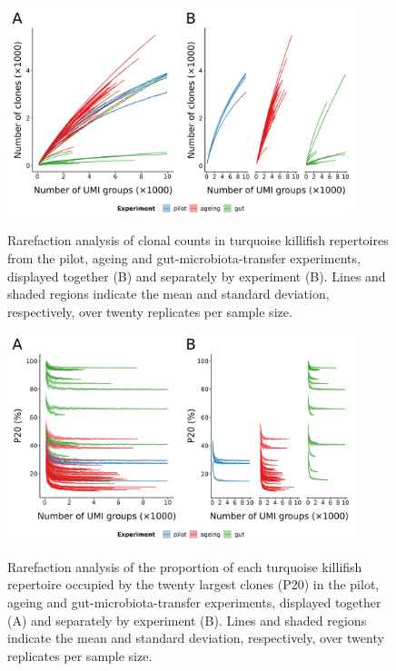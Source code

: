 \begin{figure}
\centering
\includegraphics[width = 0.9\textwidth]{_Figures/png/igseq-rarefied-clone-counts}
\begin{subfigure}{0em}
\label{fig:igseq-rarefied-clone-counts-all}
\end{subfigure}
\begin{subfigure}{0em}
\label{fig:igseq-rarefied-clone-counts-facets}
\end{subfigure}
\caption{Rarefaction analysis of clonal counts in turquoise killifish repertoires from the \igseq pilot, ageing and gut-microbiota-transfer experiments, displayed together (B) and separately by experiment (B). Lines and shaded regions indicate the mean and standard deviation, respectively, over twenty replicates per sample size.}
\label{fig:igseq-rarefied-clone-counts}
\end{figure}

\begin{figure}
\centering
\includegraphics[width = 0.9\textwidth]{_Figures/png/igseq-rarefied-clone-p20}
\begin{subfigure}{0em}
\label{fig:igseq-rarefied-clone-p20-all}
\end{subfigure}
\begin{subfigure}{0em}
\label{fig:igseq-rarefied-clone-p20-facets}
\end{subfigure}
\caption{Rarefaction analysis of the proportion of each turquoise killifish repertoire occupied by the twenty largest clones (P20) in the \igseq pilot, ageing and gut-microbiota-transfer experiments, displayed together (A) and separately by experiment (B). Lines and shaded regions indicate the mean and standard deviation, respectively, over twenty replicates per sample size.}
\label{fig:igseq-rarefied-clone-p20}
\end{figure}

